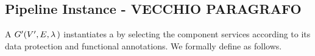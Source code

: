       
  
  
      

\subsection{Pipeline Instance - VECCHIO PARAGRAFO}\label{sec:instance}
A \pipelineInstance $G'(V',E,\lambda\,)$ instantiates a \pipelineTemplate \tChartFunction by selecting the component services according to its data protection and functional annotations. We formally define \tChartFunction as follows.

